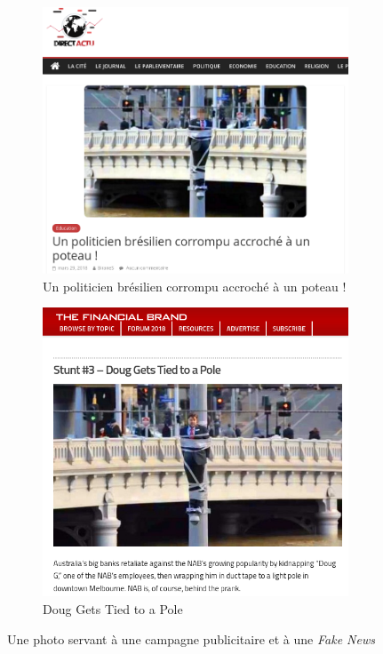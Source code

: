 \documentclass[11pt,a4paper,oldfontcommands]{memoir}
\begin{document}
\begin{center}
 \begin{figure}[h]
  \begin{subfigure}{.5\textwidth}
   \includegraphics[scale=0.240]{../../img/directactu.png}
   \caption{Un politicien brésilien corrompu accroché à un poteau !}
   \label{brezil}
  \end{subfigure}
  \begin{subfigure}{.5\textwidth}
   \includegraphics[scale=0.250]{../../img/financialbrand.png}
   \caption{Doug Gets Tied to a Pole}
   \label{financialbrand}
  \end{subfigure}
  \caption{Une photo servant à une campagne publicitaire et à une \textit{Fake News}}
  \label{compafaketruth1}
 \end{figure}
\end{center}
\end{document}
